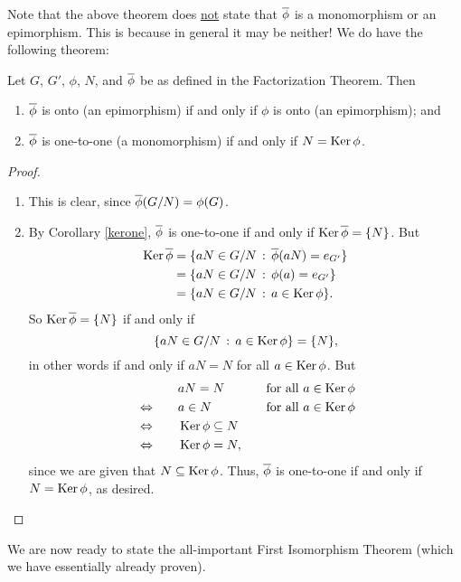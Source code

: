  Note that the above theorem does \underline{not} state that
$\overline{\phi}$ is a monomorphism or an epimorphism.  This is because in
general it may be neither! We do have the following theorem:

\begin{thm}\label{epimono} Let $G$, $G'$, $\phi$, $N$, and $\overline{\phi}$ be as
defined in the Factorization Theorem.  Then

\begin{enumerate}
\item $\overline{\phi}$ is onto (an epimorphism) if and only if $\phi$ is onto
(an epimorphism); and

\item $\overline{\phi}$ is one-to-one (a monomorphism) if and only if $N=\operatorname{Ker}
\phi$.
\end{enumerate}
\end{thm}

\begin{proof}\

\begin{enumerate}
\item
This is clear, since
$\overline{\phi}(G/N)=\phi(G)$.
\item  By Corollary
\ref{kerone}, $\overline{\phi}$ is one-to-one if and only if $\operatorname{Ker}
\overline{\phi}=\{N\}$.  But \begin{align*}\operatorname{Ker} \overline{\phi}&=\{aN\in G/N
\,:\, \overline{\phi}(aN)=e_{G'}\}\\&=\{aN\in G/N \,:\,
\phi(a)=e_{G'}\}\\&=\{aN\in G/N \,:\, a\in
\operatorname{Ker}\phi\}.\end{align*} So $\operatorname{Ker} \overline{\phi} = \{N\}$ if and only if
$$\{aN\in G/N\,:\,a\in \operatorname{Ker}\phi\}=\{N\},$$ in other words if and
only if $aN=N$ for all $a\in \operatorname{Ker}\phi$.  But
\begin{alignat*}{3}
&&&aN=N &&\text{\quad for all $a\in \operatorname{Ker}\phi$}\\
&\Leftrightarrow \quad && a\in N &&\text{\quad for all $a\in \operatorname{Ker}\phi$}\\
&\Leftrightarrow \quad && \operatorname{Ker} \phi\subseteq N&&\\
&\Leftrightarrow \quad && \operatorname{Ker}\phi=N,&&
\end{alignat*}
since we are given that
$N\subseteq \operatorname{Ker} \phi$. Thus, $\overline{\phi}$ is one-to-one
if and only if $N=\operatorname{Ker}\phi$, as desired. \qedhere \end{enumerate}

\end{proof}

 We are now ready to state the all-important First Isomorphism
Theorem (which we have essentially already proven).

